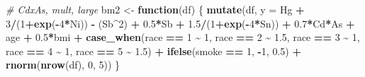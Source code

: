 \documentclass[12pt, twoside]{amherstthesis}
\newenvironment{Shaded}{\begin{snugshade}}{\end{snugshade}}
\newcommand{\AttributeTok}[1]{\textcolor[rgb]{0.13,0.29,0.53}{#1}}
\newcommand{\CommentTok}[1]{\textcolor[rgb]{0.56,0.35,0.01}{\textit{#1}}}
\newcommand{\ControlFlowTok}[1]{\textcolor[rgb]{0.13,0.29,0.53}{\textbf{#1}}}
\newcommand{\DecValTok}[1]{\textcolor[rgb]{0.00,0.00,0.81}{#1}}
\newcommand{\FloatTok}[1]{\textcolor[rgb]{0.00,0.00,0.81}{#1}}
\newcommand{\FunctionTok}[1]{\textcolor[rgb]{0.13,0.29,0.53}{\textbf{#1}}}
\newcommand{\NormalTok}[1]{#1}
\newcommand{\OtherTok}[1]{\textcolor[rgb]{0.56,0.35,0.01}{#1}}
\newcommand{\SpecialCharTok}[1]{\textcolor[rgb]{0.81,0.36,0.00}{\textbf{#1}}}
\begin{document}
\begin{Shaded}
\begin{Highlighting}[]
\CommentTok{\# CdxAs, mult, large}
\NormalTok{bm2 }\OtherTok{\textless{}{-}} \ControlFlowTok{function}\NormalTok{(df) \{}
  \FunctionTok{mutate}\NormalTok{(df, }\AttributeTok{y =} 
\NormalTok{           Hg }\SpecialCharTok{+} \DecValTok{3}\SpecialCharTok{/}\NormalTok{(}\DecValTok{1}\SpecialCharTok{+}\FunctionTok{exp}\NormalTok{(}\SpecialCharTok{{-}}\DecValTok{4}\SpecialCharTok{*}\NormalTok{Ni)) }\SpecialCharTok{{-}}\NormalTok{ (Sb}\SpecialCharTok{\^{}}\DecValTok{2}\NormalTok{) }\SpecialCharTok{+} \FloatTok{0.5}\SpecialCharTok{*}\NormalTok{Sb }\SpecialCharTok{+} \FloatTok{1.5}\SpecialCharTok{/}\NormalTok{(}\DecValTok{1}\SpecialCharTok{+}\FunctionTok{exp}\NormalTok{(}\SpecialCharTok{{-}}\DecValTok{4}\SpecialCharTok{*}\NormalTok{Sn)) }\SpecialCharTok{+} 
           \FloatTok{0.7}\SpecialCharTok{*}\NormalTok{Cd}\SpecialCharTok{*}\NormalTok{As }\SpecialCharTok{+} 
\NormalTok{           age }\SpecialCharTok{+} \FloatTok{0.5}\SpecialCharTok{*}\NormalTok{bmi }\SpecialCharTok{+} 
           \FunctionTok{case\_when}\NormalTok{(race }\SpecialCharTok{==} \DecValTok{1} \SpecialCharTok{\textasciitilde{}} \DecValTok{1}\NormalTok{, }
\NormalTok{                     race }\SpecialCharTok{==} \DecValTok{2} \SpecialCharTok{\textasciitilde{}} \FloatTok{1.5}\NormalTok{, }
\NormalTok{                     race }\SpecialCharTok{==} \DecValTok{3} \SpecialCharTok{\textasciitilde{}} \DecValTok{1}\NormalTok{, }
\NormalTok{                     race }\SpecialCharTok{==} \DecValTok{4} \SpecialCharTok{\textasciitilde{}} \DecValTok{1}\NormalTok{, }
\NormalTok{                     race }\SpecialCharTok{==} \DecValTok{5} \SpecialCharTok{\textasciitilde{}} \FloatTok{1.5}\NormalTok{) }\SpecialCharTok{+}
           \FunctionTok{ifelse}\NormalTok{(smoke }\SpecialCharTok{==} \DecValTok{1}\NormalTok{, }\SpecialCharTok{{-}}\DecValTok{1}\NormalTok{, }\FloatTok{0.5}\NormalTok{) }\SpecialCharTok{+}
           \FunctionTok{rnorm}\NormalTok{(}\FunctionTok{nrow}\NormalTok{(df), }\DecValTok{0}\NormalTok{, }\DecValTok{5}\NormalTok{))}
\NormalTok{\}}


\end{Highlighting}
\end{Shaded}
\end{document}
